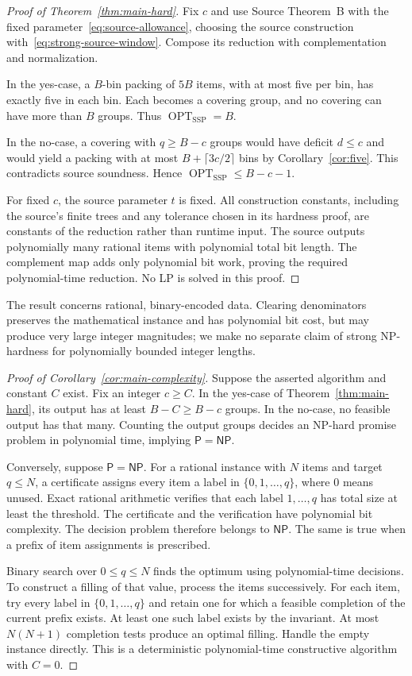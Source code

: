 \documentclass[11pt,a4paper]{article}
\theoremstyle{definition}
\theoremstyle{remark}
\newcommand{\SSP}{\mathrm{SSP}}
\newcommand{\OPT}{\operatorname{OPT}}
\newcommand{\Pclass}{\mathsf P}
\newcommand{\NPclass}{\mathsf{NP}}
\begin{document}
\begin{proof}[Proof of Theorem~\ref{thm:main-hard}]
Fix $c$ and use Source Theorem~B with the fixed parameter~\eqref{eq:source-allowance}, choosing the source construction with~\eqref{eq:strong-source-window}. Compose its reduction with complementation and normalization.

In the yes-case, a $B$-bin packing of $5B$ items, with at most five per bin, has exactly five in each bin. Each becomes a covering group, and no covering can have more than $B$ groups. Thus $\OPT_{\SSP}=B$.

In the no-case, a covering with $q\ge B-c$ groups would have deficit $d\le c$ and would yield a packing with at most $B+\lceil3c/2\rceil$ bins by Corollary~\ref{cor:five}. This contradicts source soundness. Hence $\OPT_{\SSP}\le B-c-1$.

For fixed $c$, the source parameter $t$ is fixed. All construction constants, including the source's finite trees and any tolerance chosen in its hardness proof, are constants of the reduction rather than runtime input. The source outputs polynomially many rational items with polynomial total bit length. The complement map adds only polynomial bit work, proving the required polynomial-time reduction. No LP is solved in this proof.
\end{proof}
The result concerns rational, binary-encoded data. Clearing denominators preserves the mathematical instance and has polynomial bit cost, but may produce very large integer magnitudes; we make no separate claim of strong NP-hardness for polynomially bounded integer lengths.

\begin{proof}[Proof of Corollary~\ref{cor:main-complexity}]
Suppose the asserted algorithm and constant $C$ exist. Fix an integer $c\ge C$. In the yes-case of Theorem~\ref{thm:main-hard}, its output has at least $B-C\ge B-c$ groups. In the no-case, no feasible output has that many. Counting the output groups decides an NP-hard promise problem in polynomial time, implying $\Pclass=\NPclass$.

Conversely, suppose $\Pclass=\NPclass$. For a rational instance with $N$ items and target $q\le N$, a certificate assigns every item a label in $\{0,1,\ldots,q\}$, where $0$ means unused. Exact rational arithmetic verifies that each label $1,\ldots,q$ has total size at least the threshold. The certificate and the verification have polynomial bit complexity. The decision problem therefore belongs to $\NPclass$. The same is true when a prefix of item assignments is prescribed.

Binary search over $0\le q\le N$ finds the optimum using polynomial-time decisions. To construct a filling of that value, process the items successively. For each item, try every label in $\{0,1,\ldots,q\}$ and retain one for which a feasible completion of the current prefix exists. At least one such label exists by the invariant. At most $N(N+1)$ completion tests produce an optimal filling. Handle the empty instance directly. This is a deterministic polynomial-time constructive algorithm with $C=0$.
\end{proof}
\end{document}
